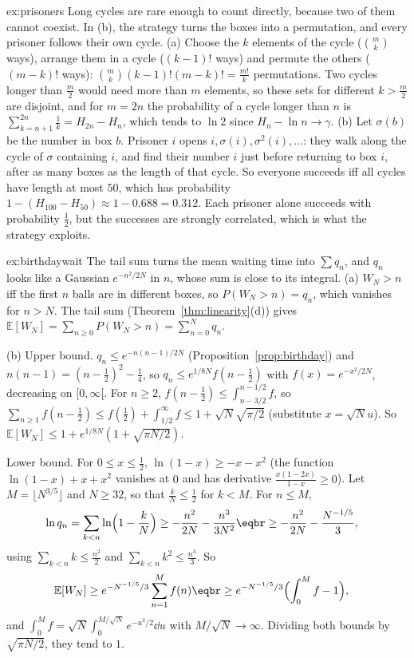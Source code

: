 \begin{solution}{ex:prisoners}
\idea Long cycles are rare enough to count directly, because two of them cannot coexist. In (b), the strategy
turns the boxes into a permutation, and every prisoner follows their own cycle.
\writeup (a) Choose the $k$ elements of the cycle ($\binom mk$ ways), arrange them in a cycle ($(k-1)!$ ways) and permute
the others ($(m-k)!$ ways): $\binom mk(k-1)!(m-k)!=\frac{m!}k$ permutations. Two cycles longer than $\frac m2$ would need more
than $m$ elements, so these sets for different $k>\frac m2$ are disjoint, and for $m=2n$ the probability of a cycle
longer than $n$ is $\sum_{k=n+1}^{2n}\frac1k=H_{2n}-H_n$, which tends to $\ln2$ since $H_n-\ln n\to\gamma$.
(b) Let $\sigma(b)$ be the number in box $b$. Prisoner $i$ opens $i,\sigma(i),\sigma^2(i),\dots$: they walk along the cycle of
$\sigma$ containing $i$, and find their number $i$ just before returning to box $i$, after as many boxes as the length of
that cycle. So everyone succeeds iff all cycles have length at most $50$, which has probability
$1-(H_{100}-H_{50})\approx1-0.688=0.312$. Each prisoner alone succeeds with probability $\frac12$, but the successes are
strongly correlated, which is what the strategy exploits.
\end{solution}

\begin{solution}{ex:birthdaywait}
\idea The tail sum turns the mean waiting time into $\sum q_n$, and $q_n$ looks like a Gaussian $e^{-n^2/2N}$ in $n$,
whose sum is close to its integral.
\writeup (a) $W_N>n$ iff the first $n$ balls are in different boxes, so $P(W_N>n)=q_n$, which vanishes for $n>N$. The tail
sum (Theorem~\ref{thm:linearity}(d)) gives $\mathbb E[W_N]=\sum_{n\ge0}P(W_N>n)=\sum_{n=0}^Nq_n$.

(b) Upper bound. $q_n\le e^{-n(n-1)/2N}$ (Proposition~\ref{prop:birthday}) and $n(n-1)=(n-\frac12)^2-\frac14$, so
$q_n\le e^{1/8N}f(n-\frac12)$ with $f(x)=e^{-x^2/2N}$, decreasing on $[0,\infty[$. For $n\ge2$, $f(n-\frac12)\le\int_{n-3/2}^{n-1/2}f$, so
$\sum_{n\ge1}f(n-\frac12)\le f(\frac12)+\int_{1/2}^\infty f\le1+\sqrt N\sqrt{\pi/2}$ (substitute $x=\sqrt Nu$). So
$\mathbb E[W_N]\le1+e^{1/8N}(1+\sqrt{\pi N/2})$.

Lower bound. For $0\le x\le\frac12$, $\ln(1-x)\ge-x-x^2$ (the function $\ln(1-x)+x+x^2$ vanishes at $0$ and has derivative
$\frac{x(1-2x)}{1-x}\ge0$). Let $M=\lfloor N^{3/5}\rfloor$ and $N\ge32$, so that $\frac kN\le\frac12$ for $k<M$. For $n\le M$,
\[
\begin{aligned}\ln q_n&=\sum_{k<n}\ln\Bigl(1-\frac kN\Bigr)\ge-\frac{n^2}{2N}-\frac{n^3}{3N^2}\eqbr\ge-\frac{n^2}{2N}-\frac{N^{-1/5}}3,\end{aligned}
\]
using $\sum_{k<n}k\le\frac{n^2}2$ and $\sum_{k<n}k^2\le\frac{n^3}3$. So
\[
\begin{aligned}\mathbb E[W_N]&\ge e^{-N^{-1/5}/3}\sum_{n=1}^Mf(n)\eqbr\ge e^{-N^{-1/5}/3}\Bigl(\int_0^Mf-1\Bigr),\end{aligned}
\]
and $\int_0^Mf=\sqrt N\int_0^{M/\sqrt N}e^{-u^2/2}\dd u$ with $M/\sqrt N\to\infty$. Dividing both bounds by $\sqrt{\pi N/2}$, they tend to
$1$.
\end{solution}

